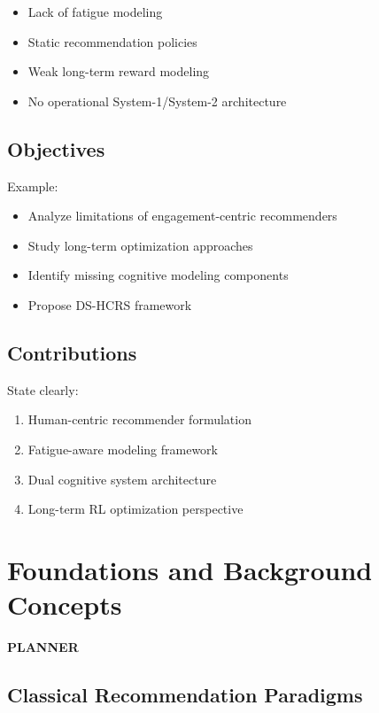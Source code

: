 \documentclass[lettersize,journal]{IEEEtran}
\begin{document}
\begin{itemize}
    \item Lack of fatigue modeling
    \item Static recommendation policies
    \item Weak long-term reward modeling
    \item No operational System-1/System-2 architecture
\end{itemize}
    
\subsection{Objectives}

Example:

\begin{itemize}
    \item Analyze limitations of engagement-centric recommenders    
    \item Study long-term optimization approaches
    \item Identify missing cognitive modeling components
    \item Propose DS-HCRS framework
\end{itemize}
    
\subsection{Contributions}

State clearly:

\begin{enumerate}
    \item Human-centric recommender formulation
    \item Fatigue-aware modeling framework
    \item Dual cognitive system architecture
    \item Long-term RL optimization perspective
\end{enumerate}


\section{Foundations and Background Concepts}

\textbf{PLANNER}

\subsection{Classical Recommendation Paradigms}
\end{document}

